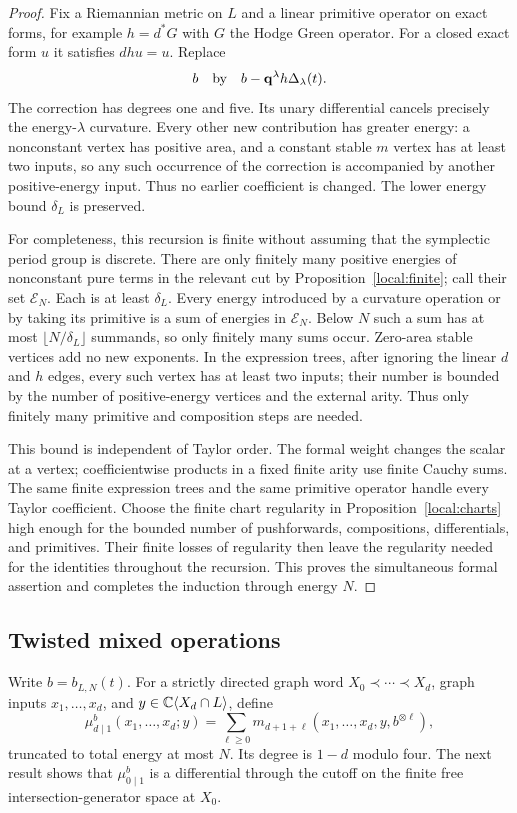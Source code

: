 \begin{proof}
Fix a Riemannian metric on $L$ and a linear primitive
operator on exact forms, for example $h=d^*G$ with $G$ the
Hodge Green operator.  For a closed exact form $u$ it
satisfies $dhu=u$.  Replace
\[
 b\quad\text{by}\quad b-\mathbf q^\lambda h\Delta_\lambda(t).
\]
The correction has degrees one and five.  Its unary
differential cancels precisely the energy-$\lambda$
curvature.  Every other new contribution has greater
energy: a nonconstant vertex has positive area, and a
constant stable $m$ vertex has at least two inputs, so any
such occurrence of the correction is accompanied by
another positive-energy input.  Thus no earlier coefficient
is changed.  The lower energy bound $\delta_L$ is preserved.

For completeness, this recursion is finite without assuming
that the symplectic period group is discrete.  There are
only finitely many positive energies of nonconstant pure
terms in the relevant cut by Proposition~\ref{local:finite};
call their set $\mathcal E_N$.  Each is at least
$\delta_L$.  Every energy introduced by a curvature
operation or by taking its primitive is a sum of energies
in $\mathcal E_N$.  Below $N$ such a sum has at most
$\lfloor N/\delta_L\rfloor$ summands, so only finitely many
sums occur.  Zero-area stable vertices add no new
exponents.  In the expression trees, after ignoring the
linear $d$ and $h$ edges, every such vertex has at least two
inputs; their number is bounded by the number of
positive-energy vertices and the external arity.  Thus
only finitely many primitive and composition steps are
needed.

This bound is independent of Taylor order.  The formal
weight changes the scalar at a vertex; coefficientwise
products in a fixed finite arity use finite Cauchy sums.
The same finite expression trees and the same primitive
operator handle every Taylor coefficient.  Choose the
finite chart regularity in Proposition~\ref{local:charts}
high enough for the bounded number of pushforwards,
compositions, differentials, and primitives.  Their finite
losses of regularity then leave the regularity needed for
the identities throughout the recursion.  This proves the
simultaneous formal assertion and completes the induction
through energy $N$.
\end{proof}

\subsection{Twisted mixed operations}

Write $b=b_{L,N}(t)$.  For a strictly directed graph word
$X_0\prec\cdots\prec X_d$, graph inputs $x_1,\ldots,x_d$,
and $y\in\mathbb C\langle X_d\cap L\rangle$, define
\begin{equation}
 \label{obs:module-twist}
 \mu^{b}_{d\mid1}(x_1,\ldots,x_d;y)
 =\sum_{\ell\ge0}m_{d+1+\ell}
       (x_1,\ldots,x_d,y,b^{\otimes\ell}),
\end{equation}
truncated to total energy at most $N$.  Its degree is $1-d$
modulo four.  The next result shows that $\mu^b_{0\mid1}$
is a differential through the cutoff on the finite free
intersection-generator space at $X_0$.

